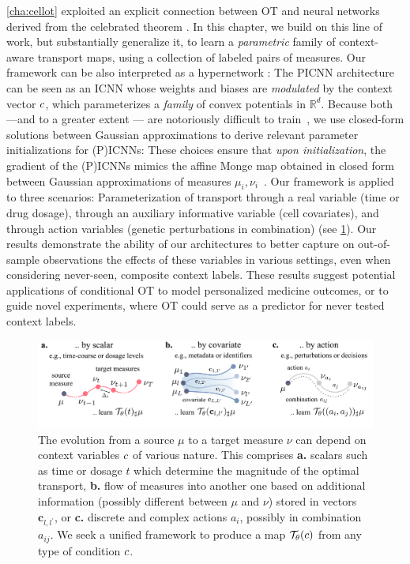  \cref{cha:cellot} exploited an explicit connection between OT and neural networks derived from the celebrated \citeauthor{brenier1987decomposition} theorem \citeyearpar{brenier1987decomposition}.
In this chapter, we build on this line of work, but substantially generalize it, to learn a {\em parametric} family of context-aware transport maps, using a collection of labeled pairs of measures.
Our framework can be also interpreted as a hypernetwork \citep{ha2016hypernetworks}: The \acrshort{PICNN} architecture can be seen as an \acrshort{ICNN} whose weights and biases are \textit{modulated} by the context vector $c$, which parameterizes a \textit{family} of convex potentials in $\mathbb{R}^d$.
%
Because both  ---and to a greater extent --- are notoriously difficult to train~\citep{richter2021input,korotin2021wasserstein,korotin2021neural}, we use closed-form solutions between Gaussian approximations to derive relevant parameter initializations for (P)ICNNs:
These choices ensure that \textit{upon initialization}, the gradient of the (P)ICNNs mimics the affine Monge map obtained in closed form between Gaussian approximations of measures $\mu_i,\nu_i$~\citep{gelbrich1990formula}.
%
Our framework is applied to three scenarios: Parameterization of transport through a real variable (time or drug dosage), through an auxiliary informative variable (cell covariates), and through action variables (genetic perturbations in combination) (see \cref{fig:overview_condot}). Our results demonstrate the ability of our architectures to better capture on out-of-sample observations the effects of these variables in various settings, even when considering never-seen, composite context labels. These results suggest potential applications of conditional OT to model personalized medicine outcomes, or to guide novel experiments, where OT could serve as a predictor for never tested context labels.


\begin{figure}
    \centering
    \includegraphics[width= \textwidth]{figures/fig_overview_condot.pdf}
    \caption{The evolution from a source $\mu$ to a target measure $\nu$ can depend on context variables $c$ of various nature. This comprises \textbf{a.} scalars such as time or dosage $t$ which determine the magnitude of the optimal transport, \textbf{b.} flow of measures into another one based on additional information (possibly different between $\mu$ and $\nu$) stored in vectors $\mathbf{c}_{l,l^\prime}$, or \textbf{c.} discrete and complex actions $a_i$, possibly in combination $a_{ij}$. We seek a unified framework to produce a map $\mathcal{T}_\theta(c)$ from any type of condition $c$.}
    \label{fig:overview_condot}
\end{figure}


